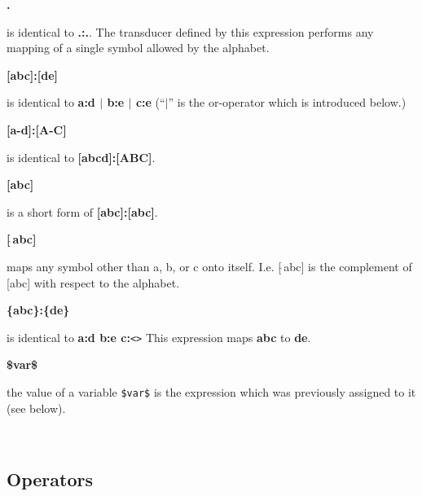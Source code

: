 \documentclass{article}
\begin{document}
\parbox[t]{2cm}{\textbf{.}}
\begin{minipage}[t]{12cm}
  is identical to \textbf{.:.}. The transducer defined by this
  expression performs any mapping of a single symbol allowed by the
  alphabet.\\
\end{minipage}

\parbox[t]{2cm}{\textbf{[abc]:[de]}}
\begin{minipage}[t]{12cm}
  is identical to \textbf{a:d $|$ b:e $|$ c:e} (``$|$'' is the or-operator
  which is introduced below.)\\
  \end{minipage}

\parbox[t]{2cm}{\textbf{[a-d]:[A-C]}}
\begin{minipage}[t]{12cm}
  is identical to \textbf{[abcd]:[ABC]}.\\
\end{minipage}
  
\parbox[t]{2cm}{\textbf{[abc]}}
\begin{minipage}[t]{12cm}
  is a short form of \textbf{[abc]:[abc]}.\\
\end{minipage}
  
\parbox[t]{2cm}{\textbf{[$\hat{~}$abc]}}
\begin{minipage}[t]{12cm}
  maps any symbol other than a, b, or c onto itself. I.e. [$\hat{~}$abc] is
  the complement of [abc] with respect to the alphabet.\\
\end{minipage}
  
\parbox[t]{2cm}{\textbf{\{abc\}:\{de\}}}
\begin{minipage}[t]{12cm}
  is identical to \textbf{a:d b:e c:}\verb#<># This expression maps
  \textbf{abc} to \textbf{de}.\\
\end{minipage}

\parbox[t]{2cm}{\textbf{\$var\$}}
\begin{minipage}[t]{12cm}
  the value of a variable \verb#$var$# is the expression which was
  previously assigned to it (see below).
\end{minipage}\\



\subsection*{Operators}
\end{document}
